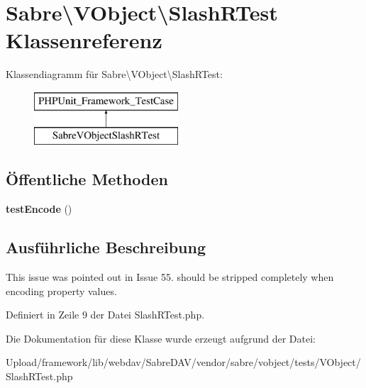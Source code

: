 \hypertarget{class_sabre_1_1_v_object_1_1_slash_r_test}{}\section{Sabre\textbackslash{}V\+Object\textbackslash{}Slash\+R\+Test Klassenreferenz}
\label{class_sabre_1_1_v_object_1_1_slash_r_test}
Klassendiagramm für Sabre\textbackslash{}V\+Object\textbackslash{}Slash\+R\+Test\+:\begin{figure}[H]
\begin{center}
\leavevmode
\includegraphics[height=2.000000cm]{class_sabre_1_1_v_object_1_1_slash_r_test}
\end{center}
\end{figure}
\subsection*{Öffentliche Methoden}
\begin{DoxyCompactItemize}
\item 
\mbox{\label{class_sabre_1_1_v_object_1_1_slash_r_test_a46c68bdc20ccc49a893579e104cdb8b0}} 
{\bfseries test\+Encode} ()
\end{DoxyCompactItemize}


\subsection{Ausführliche Beschreibung}
This issue was pointed out in Issue 55.  should be stripped completely when encoding property values. 

Definiert in Zeile 9 der Datei Slash\+R\+Test.\+php.



Die Dokumentation für diese Klasse wurde erzeugt aufgrund der Datei\+:\begin{DoxyCompactItemize}
\item 
Upload/framework/lib/webdav/\+Sabre\+D\+A\+V/vendor/sabre/vobject/tests/\+V\+Object/Slash\+R\+Test.\+php\end{DoxyCompactItemize}
